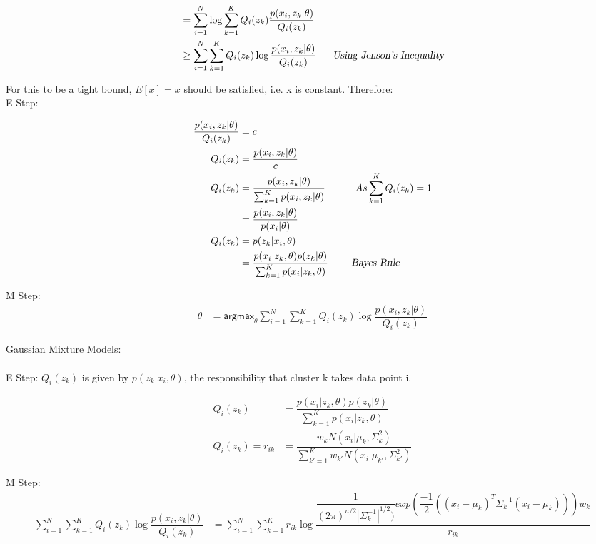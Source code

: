 \documentclass[paper=a4, fontsize=11pt]{scrartcl} %
\numberwithin{equation}{section} %
\numberwithin{figure}{section} %
\numberwithin{table}{section} %
\begin{document}
\begin{align*} 
&= \sum_{i=1}^{N} \log \sum_{k=1}^{K} Q_{i}(z_{k}) \dfrac{p(x_{i},z_{k}|\theta)}{Q_{i}(z_{k})} \\
&\geq \sum_{i=1}^{N} \sum_{k=1}^{K} Q_{i}(z_{k}) \log \dfrac{p(x_{i},z_{k}|\theta)}{Q_{i}(z_{k})} ~~~~~\textsl{Using Jenson's Inequality}
\end{align*}

For this to be a tight bound, $E[x]=x$ should be satisfied, i.e. x is constant. Therefore:\\
E Step:

\begin{align*} 
\dfrac{p(x_{i},z_{k}|\theta)}{Q_{i}(z_{k})} &= c\\
Q_{i}(z_{k}) &=  \dfrac{p(x_{i},z_{k}|\theta)}{c}\\
Q_{i}(z_{k}) &= \dfrac{p(x_{i},z_{k}|\theta)}{\sum_{k=1}^{K} p(x_{i},z_{k}|\theta) } ~~~~~~~~~ As \sum_{k=1}^{K} Q_{i}(z_{k}) = 1\\
&= \dfrac{p(x_{i},z_{k}|\theta)}{p(x_{i}|\theta) }\\
Q_{i}(z_{k}) &= p(z_{k}|x_{i},\theta)\\
&= \dfrac{p(x_{i}|z_{k},\theta)p(z_{k}|\theta)}{\sum_{k=1}^{K} p(x_{i}|z_{k},\theta) } ~~~~~~~ \textsl{Bayes Rule}\\
\end{align*}

M Step:
\begin{align*} 
\theta &= \textsf{argmax}_{\theta} \sum_{i=1}^{N} \sum_{k=1}^{K} Q_{i}(z_{k}) \log \dfrac{p(x_{i},z_{k}|\theta)}{Q_{i}(z_{k})}
\end{align*}


Gaussian Mixture Models:\\\\
E Step: $Q_{i}(z_{k})$ is given by $p(z_{k}|x_{i},\theta)$, the responsibility that cluster k takes data point i.

\begin{align*} 
Q_{i}(z_{k}) &= \dfrac{p(x_{i}|z_{k},\theta)p(z_{k}|\theta)}{\sum_{k=1}^{K} p(x_{i}|z_{k},\theta) }\\
Q_{i}(z_{k}) = r_{ik} &= \dfrac{w_{k}N(x_{i}|\mu_{k},\Sigma_{k}^{2})}{\sum_{k'=1}^{K} w_{k'}N(x_{i}|\mu_{k'},\Sigma_{k'}^{2})}
\end{align*}

M Step:
\begin{align*} 
\sum_{i=1}^{N} \sum_{k=1}^{K} Q_{i}(z_{k}) \log \dfrac{p(x_{i},z_{k}|\theta)}{Q_{i}(z_{k})} &= \sum_{i=1}^{N} \sum_{k=1}^{K} r_{ik} \log \dfrac{\dfrac{1}{(2\pi)^{n/2}|\Sigma_{k}^{-1}|^{1/2})}exp(\dfrac{-1}{2}((x_{i}-\mu_{k})^{T}\Sigma_{k}^{-1} (x_{i}-\mu_{k})))w_{k}}{r_{ik}}
\end{align*}
\end{document}
